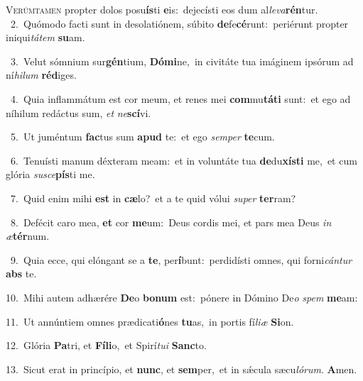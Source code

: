 \lettrine{\initial\textcolor{\initialcolor}{V}}{erúmtamen} propter dolos posu\-\textbf{ís}\-ti \textbf{e}\-is:~\star dejecísti eos dum al\-\textit{le}\-\textit{va}\textbf{rén}tur.\\
{\numbfont\textcolor{\numbcolor}{~2.}}~Quómodo facti sunt in desolatiónem, súbito \textbf{de}\-fe\-\textbf{cé}\-runt:~\star periérunt propter iniqui\-\textit{tá}\-\textit{tem} \textbf{su}\-am.\par
{\numbfont\textcolor{\numbcolor}{~3.}}~Velut sómnium sur\-\textbf{gén}\-tium, \textbf{Dó}\-\textbf{mi}ne,~\star in civitáte tua imáginem ipsórum ad ní\-\textit{hi}\-\textit{lum} \textbf{réd}\-iges.\par
{\numbfont\textcolor{\numbcolor}{~4.}}~Quia inflammátum est cor meum, et renes mei \textbf{com}\-mu\-\textbf{tá}\-\textbf{ti} sunt:~\star et ego ad níhilum redáctus sum, \textit{et} \textit{ne}\-\textbf{scí}vi.\par
{\numbfont\textcolor{\numbcolor}{~5.}}~Ut juméntum \textbf{fac}\-tus sum \textbf{a}\-\textbf{pud} te:~\star et ego \textit{sem}\-\textit{per} \textbf{te}\-cum.\par
{\numbfont\textcolor{\numbcolor}{~6.}}~Tenuísti manum déxteram meam:~\dagger et in voluntáte tua \textbf{de}\-du\-\textbf{xís}\-\textbf{ti} me,~\star et cum glória \textit{su}\-\textit{sce}\textbf{pís}ti me.\par
{\numbfont\textcolor{\numbcolor}{~7.}}~Quid enim mihi \textbf{est} in \textbf{cæ}\-lo?~\star et a te quid vólui \textit{su}\-\textit{per} \textbf{ter}\-ram?\par
{\numbfont\textcolor{\numbcolor}{~8.}}~Defécit caro mea, \textbf{et} cor \textbf{me}\-um:~\star Deus cordis mei, et pars mea Deus \textit{in} \textit{æ}\-\textbf{tér}num.\par
{\numbfont\textcolor{\numbcolor}{~9.}}~Quia ecce, qui elóngant se a \textbf{te}\-, per\-\textbf{í}\-bunt:~\star perdidísti omnes, qui forni\-\textit{cán}\-\textit{tur} \textbf{abs} te.\par
{\numbfont\textcolor{\numbcolor}{10.}}~Mihi autem adhærére \textbf{De}\-o \textbf{bo}\-\textbf{num} est:~\star pónere in Dómino De\textit{o} \textit{spem} \textbf{me}\-am:\par
{\numbfont\textcolor{\numbcolor}{11.}}~Ut annúntiem omnes prædicati\-\textbf{ó}\-nes \textbf{tu}\-as,~\star in portis fí\-\textit{li}\-\textit{æ} \textbf{Si}\-on.\par
{\numbfont\textcolor{\numbcolor}{12.}}~Glória \textbf{Pa}\-tri, et \textbf{Fí}\-\textbf{li}o,~\star et Spirí\-\textit{tu}\-\textit{i} \textbf{Sanc}\-to.\par
{\numbfont\textcolor{\numbcolor}{13.}}~Sicut erat in princípio, et \textbf{nunc}\-, et \textbf{sem}\-per,~\star et in sǽcula sæcu\-\textit{ló}\-\textit{rum}. \textbf{A}\-men.\par
